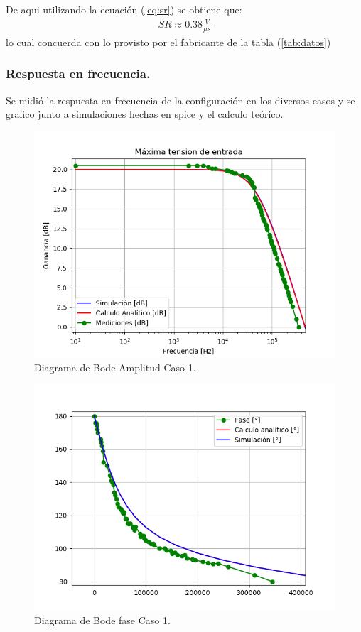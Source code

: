 De aqui utilizando la ecuación (\ref{eq:sr}) se obtiene que:
\begin{align}
SR \approx  0.38 \frac{V}{\mu s}
\end{align}
lo cual concuerda con lo provisto por el fabricante de la tabla (\ref{tab:datos})
\subsubsection{Respuesta en frecuencia.}
Se midió la respuesta en frecuencia de la configuración en los diversos casos y se grafico junto a simulaciones hechas en spice y el calculo teórico.
\begin{figure}[H]	
	\centering
	\includegraphics[width=\textwidth]{Ejercicio1/Imagenes/BodeC1.png}
	\caption{Diagrama de Bode Amplitud Caso 1.}
	\label{fig:BodeC1}
\end{figure} 
\begin{figure}[H]	
	\centering
	\includegraphics[width=\textwidth]{Ejercicio1/Imagenes/BodephC1.png}
	\caption{Diagrama de Bode fase Caso 1.}
	\label{fig:BodephC1}
\end{figure} 
